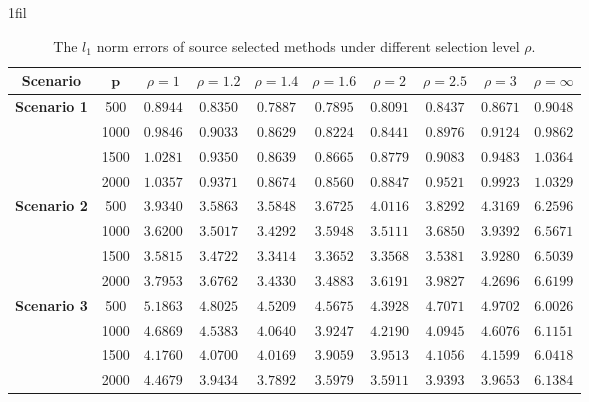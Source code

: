\documentclass[12pt]{article}
\makeatletter
\newcommand*{\centerfloat}{%
  \parindent \z@
  \leftskip \z@ \@plus 1fil \@minus \marginparwidth
  \rightskip \leftskip
  \parfillskip \z@skip}
\makeatother
\begin{document}
\begin{table}[htbp]
\renewcommand{\arraystretch}{0.65}
    \centerfloat
    \caption{The $l_1$ norm errors of source selected methods under different selection level $\rho$.}
     \label{table:l1_norm_select}
    \begin{tabular}{cccccccccc}
    \toprule
    \textbf{Scenario} & $\bm{p}$ & $\rho = 1$ & $\rho = 1.2$& $\rho = 1.4$ & $\rho = 1.6$ & $\rho = 2$ & $\rho = 2.5$ & $\rho = 3$ & $\rho=\infty$ \\
    \midrule
       \multirow{4}{*}{\textbf{Scenario 1}}  & 500 &  $0.8944$ &$0.8350$ & $0.7887$& $0.7895$& $0.8091$& $0.8437$& $0.8671$& $0.9048$  \\
                                        & 1000 &  $0.9846$& $0.9033$& $0.8629$& $0.8224$& $0.8441$& $0.8976$& $0.9124$& $0.9862$    \\ 
                                         & 1500 &  $1.0281$ &$0.9350$& $0.8639$ &$0.8665$& $0.8779$ &$0.9083$& $0.9483$ &$1.0364$   \\ 
                                          & 2000 & $1.0357$ &$0.9371$ &$0.8674$&$0.8560$ &$0.8847$& $0.9521$&$0.9923$& $1.0329 $    \\ 
                                          \hline
       \multirow{4}{*}{\textbf{Scenario 2}}  & 500 &  $3.9340$ &$3.5863$& $3.5848$ &$3.6725$ &$4.0116$ &$3.8292$ &$4.3169$ & $6.2596$    \\
                                & 1000 &   $3.6200$ &$3.5017$ &$3.4292$ &$3.5948$ &$3.5111$& $3.6850$ &$3.9392$& $6.5671$   \\ 
                                 & 1500 &   $3.5815$& $3.4722$ &$3.3414$& $3.3652$ &$3.3568$ &$3.5381$& $3.9280$& $6.5039$  \\ 
                                  & 2000 &   $3.7953$ &$3.6762$& $3.4330$& $3.4883$& $3.6191$ &$3.9827$ &$4.2696$ &$6.6199$   \\    
                                   \hline
       \multirow{4}{*}{\textbf{Scenario 3}}  & 500 &  $5.1863$ &$4.8025$& $4.5209$ &$4.5675$ &$4.3928$ &$4.7071$ &$4.9702$ & $6.0026$    \\
                                & 1000 &   $4.6869$ &$4.5383$ &$4.0640$ &$3.9247$ &$4.2190$& $4.0945$ &$4.6076$& $6.1151$   \\ 
                                 & 1500 &   $4.1760$& $4.0700$ &$4.0169$& $3.9059$ &$3.9513$ &$4.1056$& $4.1599$& $6.0418$  \\ 
                                  & 2000 &   $4.4679$ &$3.9434$& $3.7892$& $3.5979$& $3.5911$ &$3.9393$ &$3.9653$ &$6.1384$   \\              
    \bottomrule
    \end{tabular}
\end{table}
\end{document}
